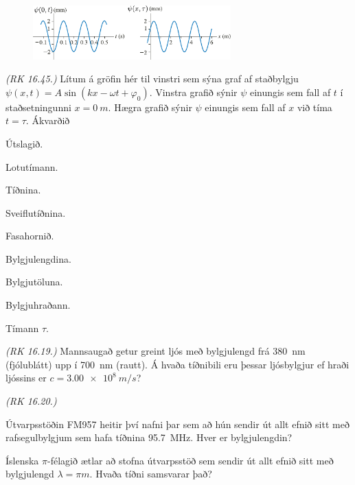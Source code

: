 \begin{enumerate}[label = \textbf{Dæmi \thechapter.\arabic*.}]
\begin{minipage}{\linewidth}

\begin{figure}
\vspace{-0.5cm}
\includegraphics[width = 3in]{figures/both-at-the-same-time2.pdf}
\end{figure}

\item \textit{(RK 16.45.)} Lítum á gröfin hér til vinstri sem sýna graf af staðbylgju $\psi(x,t) = A\sin(kx-\omega t + \varphi_0)$. Vinstra grafið sýnir $\psi$ einungis sem fall af $t$ í staðsetningunni $x = \SI{0}{m}$. Hægra grafið sýnir $\psi$ einungis sem fall af $x$ við tíma $t = \tau$. Ákvarðið
\begin{enumerate*}[label = \textbf{(\alph*)}]
    \item Útslagið.
    \item Lotutímann.
    \item Tíðnina.
    \item Sveiflutíðnina.
    \item Fasahornið.
    \item Bylgjulengdina.
    \item Bylgjutöluna.
    \item Bylgjuhraðann.
    \item Tímann $\tau$.
\end{enumerate*}
\end{minipage}

\item \textit{(RK 16.19.)} Mannsaugað getur greint ljós með bylgjulengd frá \SI{380}{nm} (fjólublátt) upp í \SI{700}{nm} (rautt). Á hvaða tíðnibili eru þessar ljósbylgjur ef hraði ljóssins er $c = \SI{3.00e8}{m/s}$? 

\item \textit{(RK 16.20.)} \begin{enumerate*}[label = \textbf{(\alph*)}] \item Útvarpsstöðin FM957 heitir því nafni þar sem að hún sendir út allt efnið sitt með rafsegulbylgjum sem hafa tíðnina \SI{95.7}{MHz}. Hver er bylgjulengdin? \item Íslenska $\pi$-félagið ætlar að stofna útvarpsstöð sem sendir út allt efnið sitt með bylgjulengd $\lambda = \pi \si{m}$. Hvaða tíðni samsvarar það?
\end{enumerate*}
\end{enumerate}

